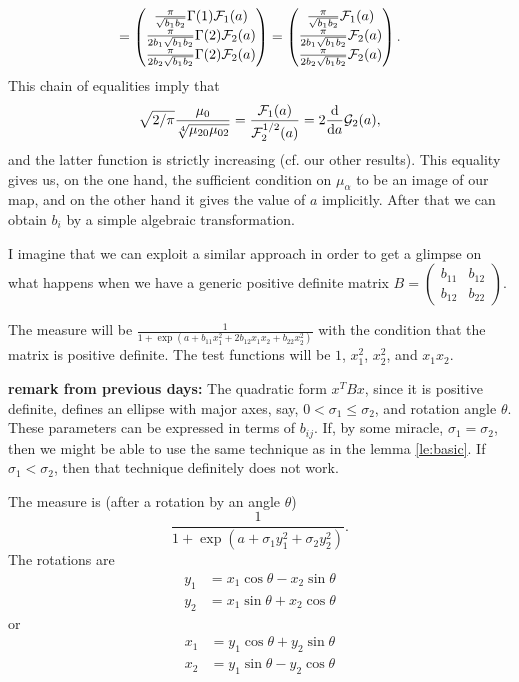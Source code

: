 \documentclass{article}
\begin{document}
\[
=
\begin{pmatrix}
		\frac{\pi }{\sqrt{b_1b_2}}\Gamma(1)\mathcal F_1(a)\\
		\frac{\pi}{2b_1\sqrt{b_1b_2}}\Gamma(2)\mathcal F_2(a)\\
		\frac{\pi}{2b_2\sqrt{b_1b_2}}\Gamma(2)\mathcal F_2(a)
	\end{pmatrix}
=
\begin{pmatrix}
		\frac{\pi }{\sqrt{b_1b_2}}\mathcal F_1(a)\\
		\frac{\pi}{2b_1\sqrt{b_1b_2}}\mathcal F_2(a)\\
		\frac{\pi}{2b_2\sqrt{b_1b_2}}\mathcal F_2(a)
	\end{pmatrix}.
\]
This chain of equalities imply that
\[
	\sqrt{2/\pi}\frac{\mu_0}{\sqrt[4]{\mu_{20}\mu_{02}}} = \frac{\mathcal F_1(a)}{\mathcal F_2^{1/2}(a)} = 2\frac{\mathrm d}{\mathrm da}\mathcal G_{2}(a),
\]
and the latter function is strictly increasing (cf. our other results).
This equality gives us, on the one hand, the sufficient condition on $\mu_{\alpha}$ to be an image of our map, and on the other hand it gives the value of $a$ implicitly.
After that we can obtain $b_i$ by a simple algebraic transformation.

I imagine that we can exploit a similar approach in order to get a glimpse on what happens when we have a generic positive definite matrix $B = \begin{pmatrix}
	b_{11}&b_{12}\\b_{12}&b_{22}
\end{pmatrix}$.

 The measure will be $\frac{1}{1+\exp(a+b_{11}x_1^2+2b_{12}x_1x_2+b_{22}x_2^2)}$ with the condition that the matrix  is positive definite. The test functions will be $1$, $x_1^2$, $x_{2}^2$, and $x_1x_2$.

 \textbf{remark from previous days:} The quadratic form $x^TBx$, since it is positive definite, defines an ellipse with major axes, say, $0<\sigma_1\le\sigma_2$, and rotation angle $\theta$. These parameters can be expressed in terms of $b_{ij}$. If, by some miracle, $\sigma_1=\sigma_2$, then we might be able to use the same technique as in the lemma \ref{le:basic}. If $\sigma_1<\sigma_2$, then that technique definitely does not work.

The measure is (after a rotation by an angle $\theta$) 
\[
	\frac{1}{1+\exp(a+\sigma_1y_1^2+\sigma_2y_2^2)}.
\]
The rotations are
\begin{align*}
	y_1 &=  x_1\cos \theta-x_2\sin\theta\\
	y_2&= x_1\sin\theta+x_2\cos\theta
\end{align*}
or
\begin{align*}
	x_1 &=  y_1\cos \theta+y_2\sin\theta\\
	x_2&= y_1\sin\theta-y_2\cos\theta
\end{align*}
\end{document}
